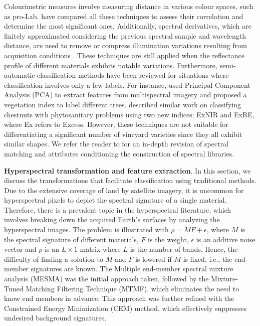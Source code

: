 Colourimetric measures involve measuring distance in various colour spaces, such as pro-Lab. \cite{agarla_analysis_2021} have compared all these techniques to assess their correlation and determine the most significant ones. Additionally, spectral derivatives, which are finitely approximated considering the previous spectral sample and wavelength distance, are used to remove or compress illumination variations resulting from acquisition conditions \cite{fernandes_grapevine_2019, pu_hyperspectral_2017}. These techniques are still applied when the reflectance profile of different materials exhibits notable variations. Furthermore, semi-automatic classification methods have been reviewed for situations where classification involves only a few labels. For instance, \cite{ahmed_applied_2021} used Principal Component Analysis (PCA) to extract features from multispectral imagery and proposed a vegetation index to label different trees. \cite{padua_monitoring_2020} described similar work on classifying chestnuts with phytosanitary problems using two new indices: ExNIR and ExRE, where Ex refers to Excess. However, these techniques are not suitable for differentiating a significant number of vineyard varieties since they all exhibit similar shapes. We refer the reader to \cite{shanmugam_spectral_2014} for an in-depth revision of spectral matching and attributes conditioning the construction of spectral libraries.

\textbf{Hyperspectral transformation and feature extraction}. In this section, we discuss the transformations that facilitate classification using traditional methods. Due to the extensive coverage of land by satellite imagery, it is uncommon for hyperspectral pixels to depict the spectral signature of a single material. Therefore, there is a prevalent topic in the hyperspectral literature, which involves breaking down the acquired Earth's surfaces by analyzing the hyperspectral images. The problem is illustrated with $\rho = \textit{MF} + \epsilon$, where $M$ is the spectral signature of different materials, $F$ is the weight, $\epsilon$ is an additive noise vector and $\rho$ is an $L \times 1$ matrix where $L$ is the number of bands. Hence, the difficulty of finding a solution to $M$ and $F$ is lowered if $M$ is fixed, i.e., the end-member signatures are known. The Multiple end-member spectral mixture analysis (MESMA) was the initial approach taken,
followed by the Mixture-Tuned Matching Filtering Technique (MTMF), which eliminates the need to know end members in advance. This approach was further refined with the Constrained Energy Minimization (CEM) method, which effectively suppresses undesired background signatures.

